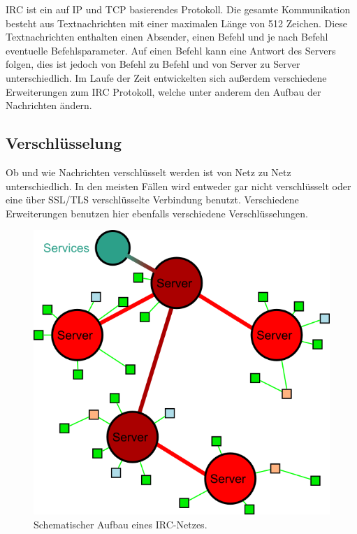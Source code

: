 IRC ist ein auf IP und TCP basierendes Protokoll. Die gesamte Kommunikation besteht aus Textnachrichten mit einer maximalen Länge von 512 Zeichen. Diese Textnachrichten enthalten einen Absender, einen Befehl und je nach Befehl eventuelle Befehlsparameter. Auf einen Befehl kann eine Antwort des Servers folgen, dies ist jedoch von Befehl zu Befehl und von Server zu Server unterschiedlich. Im Laufe der Zeit entwickelten sich außerdem verschiedene Erweiterungen zum IRC Protokoll, welche unter anderem den Aufbau der Nachrichten ändern. 

\subsection{Verschlüsselung}

Ob und wie Nachrichten verschlüsselt werden ist von Netz zu Netz unterschiedlich. In den meisten Fällen wird entweder gar nicht verschlüsselt oder eine über SSL/TLS verschlüsselte Verbindung benutzt. Verschiedene Erweiterungen benutzen hier ebenfalls verschiedene Verschlüsselungen.

\begin{figure}[h]
  \includegraphics[width=\linewidth]{Ircnetz.png}
  \caption{Schematischer Aufbau eines IRC-Netzes.}
  \label{abb:Ircnetz}
\end{figure}

